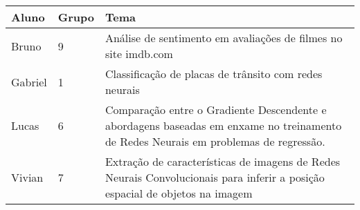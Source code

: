 \begin{table}[h]
\begin{tabular}{|l|l|p{11cm}|}
\hline Aluno & Grupo & Tema \\
\hline Bruno & 9 & Análise de sentimento em avaliações de filmes no site imdb.com \\
\hline Gabriel & 1 & Classificação de placas de trânsito com redes neurais \\
\hline Lucas & 6 & Comparação entre o Gradiente Descendente e abordagens baseadas em enxame no treinamento de Redes Neurais em problemas de regressão. \\
\hline Vivian & 7 & Extração de características de imagens de Redes Neurais Convolucionais para inferir a posição espacial de objetos na imagem \\
\hline
\end{tabular}
\end{table}
